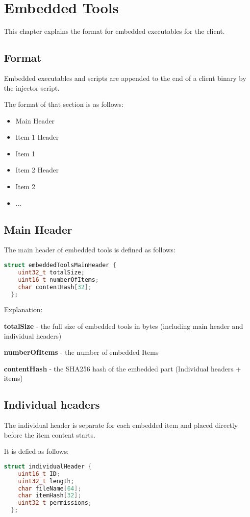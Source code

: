 \chapter{Embedded Tools}
This chapter explains the format for embedded executables for the client.

\section{Format}
Embedded executables and scripts are appended to the end of a client binary by the injector script.

The format of that section is as follows:
\begin{itemize}
  \item Main Header
  \item Item 1 Header
  \item Item 1
  \item Item 2 Header
  \item Item 2
  \item ...
\end{itemize}
\section{Main Header}
The main header of embedded tools is defined as follows:
\begin{lstlisting}[language=C++]
  struct embeddedToolsMainHeader {
    uint32_t totalSize;
    uint16_t numberOfItems;
    char contentHash[32];
  };
\end{lstlisting}

Explanation:

\textbf{totalSize} - the full size of embedded tools in bytes (including main header and individual headers)

\textbf{numberOfItems} - the number of embedded Items

\textbf{contentHash} - the SHA256 hash of the embedded part (Individual headers + items)

\section{Individual headers}

The individual header is separate for each embedded item and placed directly before the item content starts.

It is defied as follows:
\begin{lstlisting}[language=C++]
  struct individualHeader {
    uint16_t ID;
    uint32_t length;
    char fileName[64];
    char itemHash[32];
    uint32_t permissions;
  };
\end{lstlisting}

